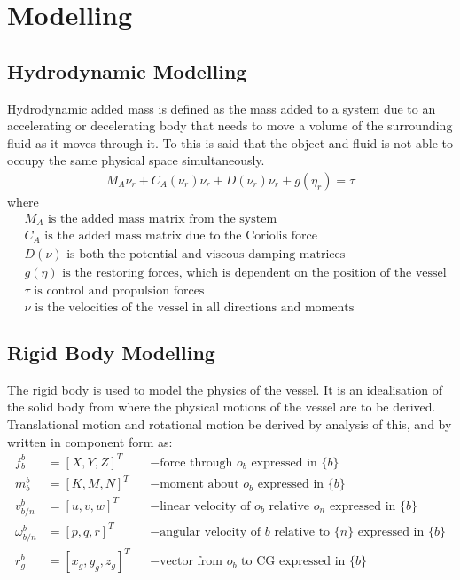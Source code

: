 \chapter{Modelling}

\section{Hydrodynamic Modelling}
Hydrodynamic added mass is defined as the mass added to a system due to an accelerating or decelerating body that needs to move a volume of the surrounding fluid as it moves through it. To this is said that the object and fluid is not able to occupy the same physical space simultaneously.
\begin{align}
M_A \dot \nu_r + C_A(\nu_r)\nu_r + D(\nu_r)\nu_r + g(\eta_r) = \tau
\label{eq:hydmodel}
\end{align}
%
where
\begin{align}
&M_A \text{ is the added mass matrix from the system}\nonumber\\
&C_A \text{ is the added mass matrix due to the Coriolis force}\nonumber\\
&D(\nu) \text{ is both the potential and viscous damping matrices}\nonumber\\
&g(\eta) \text{ is the restoring forces, which is dependent on the position of the vessel}\nonumber\\
&\tau \text{ is control and propulsion forces}\nonumber\\
&\nu \text{ is the velocities of the vessel in all directions and moments}
\end{align}

\section{Rigid Body Modelling}
The rigid body is used to model the physics of the vessel. It is an idealisation of the solid body from where the physical motions of the vessel are to be derived. Translational motion and rotational motion be derived by analysis of this, and by \citep{fossen} written in component form as:
\begin{align}
f^b_b &= [X,Y,Z]^T & &- \text{force through } o_b \text{ expressed in } \{b\}\\
m^b_b &= [K,M,N]^T & &- \text{moment about } o_b \text{ expressed in } \{b\}\\
v^b_{b/n} &= [u,v,w]^T & &- \text{linear velocity of } o_b \text{ relative } o_n \text{ expressed in } \{b\}\\
\omega^b_{b/n} &= [p,q,r]^T & &- \text{angular velocity of } {b} \text{ relative to } \{n\} \text{ expressed in } \{b\}\\
r^b_g &= [x_g,y_g,z_g]^T & &- \text{vector from } o_b \text{ to CG expressed in } \{b\}
\end{align}

